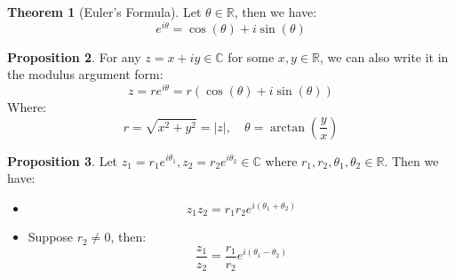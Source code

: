 \documentclass[11pt]{article}
\theoremstyle{definition}
\newtheorem{prop}{Proposition}[section]
\newtheorem{thm}[prop]{Theorem}
\newcommand{\brac}[1]{\left(#1\right)}
\newcommand{\abs}[1]{\left\lvert#1\right\rvert}
\newcommand{\R}{\mathbb{R}}
\newcommand{\C}{\mathbb{C}}
\begin{document}
	\begin{thm}[Euler's Formula]
		Let $\theta\in\R$, then we have:
		$$e^{i\theta} = \cos\brac{\theta}+i\sin\brac{\theta}$$
	\end{thm}
	\begin{prop}
		For any $z =x + iy \in\C$ for some $x,y\in\R$, we can also write it in the modulus argument form:
		$$ z = re^{i\theta} = r\brac{\cos\brac{\theta}+i\sin\brac{\theta}}$$
		Where:
		$$ r = \sqrt{x^2+y^2} = \abs{z},\quad \theta = \arctan\brac{\frac{y}{x}}$$
	\end{prop}
	\begin{prop}
		Let $z_1=r_1e^{i\theta_1},z_2 = r_2e^{i\theta_2}\in\C$ where $r_1,r_2,\theta_1,\theta_2\in\R$. Then we have:
		\begin{itemize}
			\item $$z_1z_2 = r_1r_2e^{i\brac{\theta_1+\theta_2}}$$
			\item Suppose $r_2 \neq 0$, then:
			$$\frac{z_1}{z_2}=\frac{r_1}{r_2}e^{i\brac{\theta_1-\theta_2}}$$
		\end{itemize}
	\end{prop}
\end{document}
